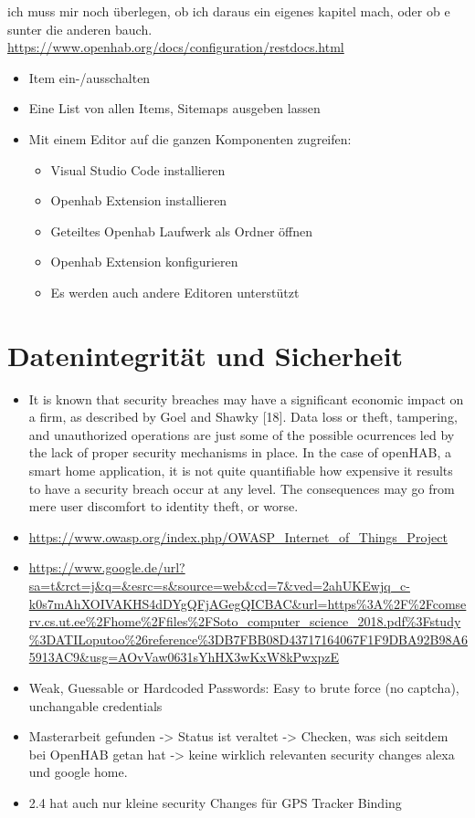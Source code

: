 ich muss mir noch überlegen, ob ich daraus ein eigenes kapitel mach, oder ob e sunter die anderen bauch.
\url{https://www.openhab.org/docs/configuration/restdocs.html}
\begin{itemize}
	\item Item ein-/ausschalten
	\item Eine List von allen Items, Sitemaps ausgeben lassen
	\item Mit einem Editor auf die ganzen Komponenten zugreifen:
	\begin{itemize}
		\item Visual Studio Code installieren
		\item Openhab Extension installieren
		\item Geteiltes Openhab Laufwerk als Ordner öffnen
		\item Openhab Extension konfigurieren
		\item Es werden auch andere Editoren unterstützt
	\end{itemize}
\end{itemize}

\section{Datenintegrität und Sicherheit}
\begin{itemize}
	 \item It is known that security breaches may have a significant economic impact on a firm, as
	 described by Goel and Shawky [18]. Data loss or theft, tampering, and unauthorized
	 operations are just some of the possible ocurrences led by the lack of proper security
	 mechanisms in place. In the case of openHAB, a smart home application, it is not quite
	 quantifiable how expensive it results to have a security breach occur at any level. The
	 consequences may go from mere user discomfort to identity theft, or worse.
	\item \url{https://www.owasp.org/index.php/OWASP_Internet_of_Things_Project}
	\item \url{https://www.google.de/url?sa=t&rct=j&q=&esrc=s&source=web&cd=7&ved=2ahUKEwjq_c-k0s7mAhXOIVAKHS4dDYgQFjAGegQICBAC&url=https%3A%2F%2Fcomserv.cs.ut.ee%2Fhome%2Ffiles%2FSoto_computer_science_2018.pdf%3Fstudy%3DATILoputoo%26reference%3DB7FBB08D43717164067F1F9DBA92B98A65913AC9&usg=AOvVaw0631sYhHX3wKxW8kPwxpzE}
	\item Weak, Guessable or Hardcoded Passwords: Easy to brute force (no captcha), unchangable credentials
	\item Masterarbeit gefunden -> Status ist veraltet -> Checken, was sich seitdem bei OpenHAB getan hat -> keine wirklich relevanten security changes alexa und google home.
	\item 2.4 hat auch nur kleine security Changes für GPS Tracker Binding
\end{itemize}
